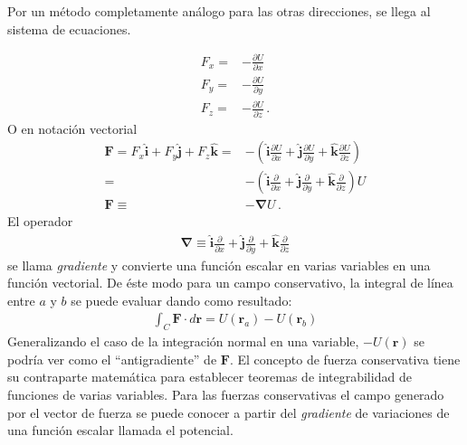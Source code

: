 Por un método completamente análogo para las otras direcciones, se llega al sistema de ecuaciones. 

\begin{align}
  F_x=& -\frac{\partial U}{\partial x}\nonumber\\
   F_y=& -\frac{\partial U}{\partial y}\nonumber\\
   F_z=& -\frac{\partial U}{\partial z}\,.
\end{align}
O en notación vectorial
\begin{align}
 \mathbf{F}=F_x\hat{\mathbf{i}}+F_y\hat{\mathbf{j}}+F_z\hat{\mathbf{k}}
=&-\left(\hat{\mathbf{i}}\frac{\partial U}{\partial x}
+\hat{\mathbf{j}}\frac{\partial U}{\partial y}
+\hat{\mathbf{k}}\frac{\partial U}{\partial z}\right)\nonumber\\
=&-\left(\hat{\mathbf{i}}\frac{\partial }{\partial x}
+\hat{\mathbf{j}}\frac{\partial }{\partial y}
+\hat{\mathbf{k}}\frac{\partial }{\partial z}
\right)U\nonumber\\
\mathbf{F}\equiv& -\boldsymbol{\nabla}U\,.
\end{align}
El operador
\begin{align}
\boldsymbol{\nabla}\equiv \hat{\mathbf{i}}\frac{\partial }{\partial x}
+\hat{\mathbf{j}}\frac{\partial }{\partial y}
+\hat{\mathbf{k}}\frac{\partial }{\partial z}
\end{align}
se llama \emph{gradiente} y convierte una función escalar en varias variables en una función vectorial. De éste modo para un campo conservativo, la integral de línea entre $a$ y $b$ se puede evaluar dando como resultado:
\begin{align}
  \int_C\mathbf{F}\cdot d\mathbf{r}=U(\mathbf{r}_a)-U(\mathbf{r}_b)
\end{align}
Generalizando el caso de la integración normal en una variable,
$-U(\mathbf{r})$ se podría ver como el ``antigradiente'' de
$\mathbf{F}$. El concepto de fuerza conservativa tiene su contraparte
matemática para establecer teoremas de integrabilidad de funciones de
varias variables. Para las fuerzas conservativas el campo generado por
el vector de fuerza se puede conocer a partir del \emph{gradiente} de
variaciones de una función escalar llamada el potencial.

